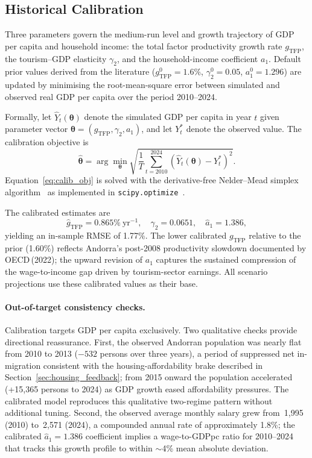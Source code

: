 \documentclass{article}
\begin{document}
\subsection{Historical Calibration}
\label{sec:calibration}

Three parameters govern the medium-run level and growth trajectory of GDP per
capita and household income: the total factor productivity growth rate
$g_\text{TFP}$, the tourism--GDP elasticity $\gamma_2$, and the
household-income coefficient $a_1$. Default prior values derived from the
literature ($g_\text{TFP}^0=1.6\%$, $\gamma_2^0=0.05$, $a_1^0=1.296$) are
updated by minimising the root-mean-square error between simulated and observed
real GDP per capita over the period 2010--2024.

Formally, let $\hat{Y}_t(\boldsymbol{\theta})$ denote the simulated GDP per
capita in year $t$ given parameter vector
$\boldsymbol{\theta}=(g_\text{TFP},\gamma_2,a_1)$, and let $Y_t^*$ denote the
observed value. The calibration objective is
\begin{equation}
  \hat{\boldsymbol{\theta}} = \arg\min_{\boldsymbol{\theta}}
    \sqrt{\frac{1}{T}\sum_{t=2010}^{2024}
    \left(\hat{Y}_t(\boldsymbol{\theta}) - Y_t^*\right)^2}.
  \label{eq:calib_obj}
\end{equation}
Equation~\eqref{eq:calib_obj} is solved with the derivative-free Nelder--Mead
simplex algorithm~\cite{Nelder1965} as implemented in
\texttt{scipy.optimize}~\cite{Virtanen2020}.

The calibrated estimates are
\begin{equation}
  \hat{g}_\text{TFP} = 0.865\%~\text{yr}^{-1}, \quad
  \hat{\gamma}_2 = 0.0651, \quad
  \hat{a}_1 = 1.386,
  \label{eq:calib_result}
\end{equation}
yielding an in-sample RMSE of 1.77\%. The lower calibrated $g_\text{TFP}$
relative to the prior (1.60\%) reflects Andorra's post-2008 productivity
slowdown documented by OECD\,(2022); the upward revision of $a_1$ captures the
sustained compression of the wage-to-income gap driven by tourism-sector
earnings. All scenario projections use these calibrated values as their base.

\paragraph{Out-of-target consistency checks.}
Calibration targets GDP per capita exclusively. Two qualitative checks provide
directional reassurance. First, the observed Andorran population was nearly flat
from 2010 to 2013 ($-532$ persons over three years), a period of suppressed net
in-migration consistent with the housing-affordability brake described in
Section~\ref{sec:housing_feedback}; from 2015 onward the population accelerated
(+15{,}365 persons to 2024) as GDP growth eased affordability pressures. The
calibrated model reproduces this qualitative two-regime pattern without
additional tuning. Second, the observed average monthly salary grew from
\EUR\,1{,}995 (2010) to \EUR\,2{,}571 (2024), a compounded annual rate of
approximately 1.8\%; the calibrated $\hat{a}_1=1.386$ coefficient implies a
wage-to-GDPpc ratio for 2010--2024 that tracks this growth profile to within
$\sim$4\% mean absolute deviation.
\end{document}
